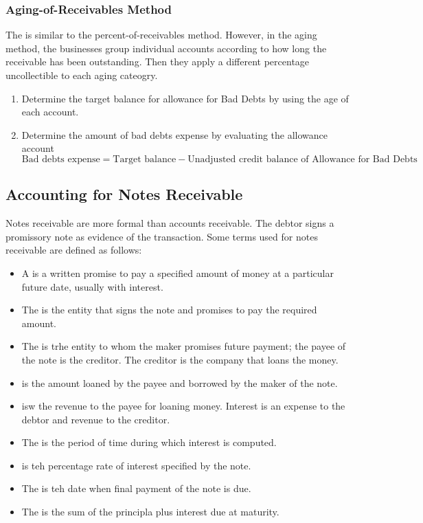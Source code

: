 \documentclass{article}
\begin{document}
\subsubsection{Aging-of-Receivables Method} 

The  is similar to the percent-of-receivables method. However, in the aging method, the businesses group individual accounts according to how long the receivable has been outstanding. Then they apply a different percentage uncollectible to each aging cateogry. 
\begin{enumerate}
  \item Determine the target balance for allowance for Bad Debts by using the age of each account. 
  \item Determine the amount of bad debts expense by evaluating the allowance account $$\textrm{Bad debts expense} = \textrm{Target balance} - \textrm{Unadjusted credit balance of Allowance for Bad Debts}$$
\end{enumerate}

\subsection{Accounting for Notes Receivable}

Notes receivable are more formal than accounts receivable. The debtor signs a promissory note as evidence of the transaction. Some terms used for notes receivable are defined as follows:
\begin{itemize}
  \item A  is a written promise to pay a specified amount of money at a particular future date, usually with interest. 
  \item The  is the entity that signs the note and promises to pay the required amount. 
  \item The  is trhe entity to whom the maker promises future payment; the payee of the note is the creditor. The creditor is the company that loans the money. 
  \item {} is the amount loaned by the payee and borrowed by the maker of the note. 
  \item {} isw the revenue to the payee for loaning money. Interest is an expense to the debtor and revenue to the creditor. 
  \item The  is the period of time during which interest is computed. 
  \item {} is teh percentage rate of interest specified by the note. 
  \item The  is teh date when final payment of the note is due. 
  \item The  is the sum of the principla plus interest due at maturity. 
\end{itemize}
\end{document}
